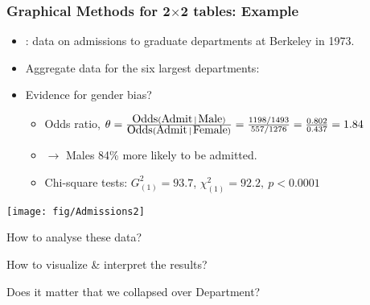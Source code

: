 \renewcommand{\FileName}{twobytwo}

\begin{frame}
\frametitle{Graphical Methods for 2$\times$2 tables: Example}
\begin{itemize}
 \item \citet{Bickel-etal:75}: data on admissions to graduate departments
 at Berkeley in 1973.
 \item Aggregate data for the six largest departments:
 

 \item Evidence for gender bias?
 \begin{itemize}

 \item Odds ratio, 
 $\theta = \frac{\mbox{Odds}(\mbox{Admit}\, | \,\mbox{Male})}{\mbox{Odds}(\mbox{Admit}\, | \,\mbox{Female})} = 
 \frac{1198 / 1493}{557 / 1276} = \frac{0.802}{0.437} = 
 1.84$
 \item $\rightarrow$ Males 84\% more likely to be admitted. 
 \item Chi-square tests: $G^2_{(1)} = 93.7$, $\chi^2_{(1)} = 92.2, \: p < 0.0001$
 \end{itemize}
\end{itemize}

\end{frame}
\begin{frame}[plain]
\begin{center}
\texttt{[image: fig/Admissions2]}
\end{center}
\begin{itemize*}
 \item How to analyse these data?
 \item How to visualize \& interpret the results?
 \item Does it matter that we collapsed over Department?
\end{itemize*}


\end{frame}


